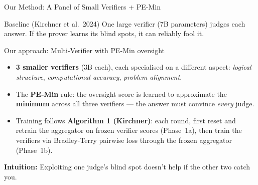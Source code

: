 \documentclass[aspectratio=169]{beamer}
\begin{document}
\begin{frame}{Our Method: A Panel of Small Verifiers + PE-Min}

  \begin{block}{Baseline (Kirchner et al.\ 2024)}
    One large verifier (7B parameters) judges each answer.
    If the prover learns its blind spots, it can reliably fool it.
  \end{block}

  \vspace{0.4em}
  \begin{exampleblock}{Our approach: Multi-Verifier with PE-Min oversight}
    \begin{itemize}
      \item \textbf{3 smaller verifiers} (3B each), each specialised on a different
            aspect: \emph{logical structure}, \emph{computational accuracy},
            \emph{problem alignment}.
      \item The \textbf{PE-Min} rule: the oversight score is learned to approximate
            the \textbf{minimum} across all three verifiers --- the answer must
            convince \emph{every} judge.
      \item Training follows \textbf{Algorithm 1 (Kirchner)}: each round, first
            reset and retrain the aggregator on frozen verifier scores
            (Phase~1a), then train the verifiers via Bradley-Terry pairwise loss
            through the frozen aggregator (Phase~1b).
    \end{itemize}
  \end{exampleblock}

  \vspace{0.3em}
  \textbf{Intuition:} Exploiting one judge's blind spot doesn't help if
  the other two catch you.

\end{frame}
\end{document}
